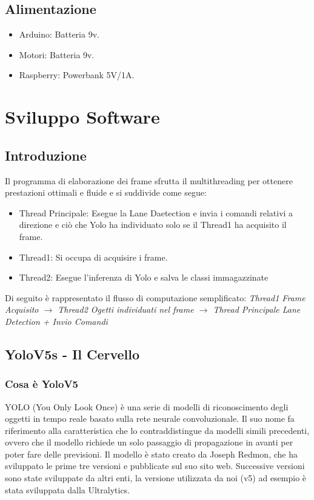 \documentclass{article}
\begin{document}
\newpage

\subsection{Alimentazione}
\begin{itemize}
\item Arduino: Batteria 9v.
\item Motori: Batteria 9v.
\item Raspberry: Powerbank 5V/1A.
\end{itemize}

\section{Sviluppo Software}
\subsection{Introduzione}
Il programma di elaborazione dei frame sfrutta il \cite{multithreading} multithreading per ottenere prestazioni ottimali e fluide e si suddivide come segue:

\begin{itemize}
    \item Thread Principale: Esegue la Lane Daetection e invia i comandi relativi a direzione e ciò che Yolo ha individuato solo se il Thread1 ha acquisito il frame.
    \item Thread1: Si occupa di acquisire i frame. 
    \item Thread2: Esegue l'inferenza di Yolo e salva le classi immagazzinate
\end{itemize} 

Di seguito è rappresentato il flusso di computazione semplificato:
\textit{Thread1 Frame Acquisito  $\rightarrow$ Thread2 Ogetti individuati nel frame $\rightarrow$ Thread Principale Lane Detection + Invio Comandi}  


\subsection{YoloV5s - Il Cervello}
    
    \subsubsection{Cosa è YoloV5}
    \cite{yolov5arch}
    YOLO (You Only Look Once) è una serie di modelli di riconoscimento degli oggetti in tempo reale basato sulla rete neurale convoluzionale. Il suo nome fa riferimento alla caratteristica che lo contraddistingue da modelli simili precedenti, ovvero che il modello richiede un solo passaggio di propagazione in avanti per poter fare delle previsioni.
    Il modello è stato creato da Joseph Redmon, che ha sviluppato le prime tre versioni e pubblicate sul suo sito web. Successive versioni sono state sviluppate da altri enti, la versione utilizzata da noi (v5) ad esempio è stata sviluppata dalla Ultralytics.
    
\end{document}

